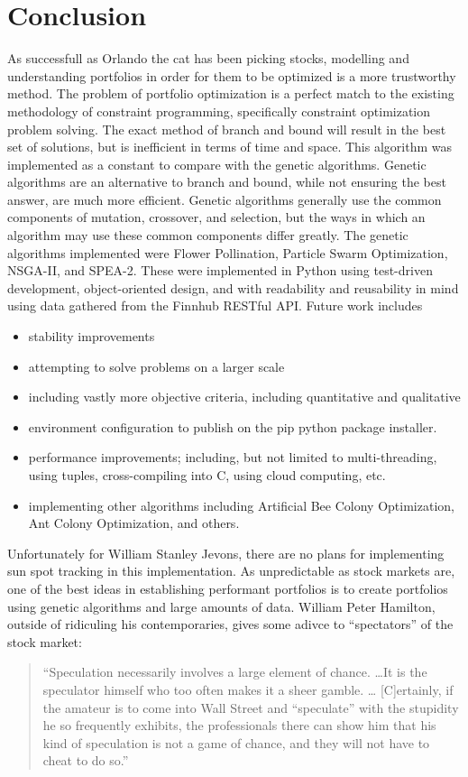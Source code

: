 \documentclass{article}
\begin{document}
    \section{Conclusion}
    As successfull as Orlando the cat has been picking stocks, modelling and understanding portfolios in order for them to be optimized is a more trustworthy 
    method. The problem of portfolio optimization is a perfect match to the existing methodology of constraint programming, specifically constraint optimization 
    problem solving. The exact method of branch and bound will result in the best set of solutions, but is inefficient in terms of time and space. This algorithm
    was implemented as a constant to compare with the genetic algorithms. Genetic algorithms are an alternative to branch and bound, while not ensuring the best 
    answer, are much more efficient. Genetic algorithms generally use the common components of mutation, crossover, and selection, but the ways in which an 
    algorithm may use these common components differ greatly. The genetic algorithms implemented were Flower Pollination, Particle Swarm Optimization, NSGA-II, 
    and SPEA-2. These were implemented in Python using test-driven development, object-oriented design, and with readability and reusability in mind using data 
    gathered from the Finnhub RESTful API. Future work includes 
    \begin{itemize}
        \item stability improvements
        \item attempting to solve problems on a larger scale
        \item including vastly more objective criteria, including quantitative and qualitative
        \item environment configuration to publish on the pip python package installer.
        \item performance improvements; including, but not limited to multi-threading, using tuples, cross-compiling into C, using cloud computing, etc.
        \item implementing other algorithms including Artificial Bee Colony Optimization, Ant Colony Optimization, and others.
    \end{itemize}
    Unfortunately for William Stanley Jevons, there are no plans for implementing sun spot tracking in this implementation. As unpredictable as
    stock markets are, one of the best ideas in establishing performant portfolios is to create portfolios using genetic algorithms and large 
    amounts of data. William Peter Hamilton, outside of ridiculing his contemporaries, gives some adivce to ``spectators'' of the stock market:
    \begin{quotation}
        ``Speculation necessarily involves a large element of chance. \ldots It is the speculator himself who too often makes it a sheer gamble. \ldots
        [C]ertainly, if the amateur is to come into Wall Street and ``speculate'' with the stupidity he so frequently exhibits, the professionals there
        can show him that his kind of speculation is not a game of chance, and they will not have to cheat to do so.''
    \end{quotation}
    \cite{Hamilton}
    \newpage
    \printbibliography
\end{document}
